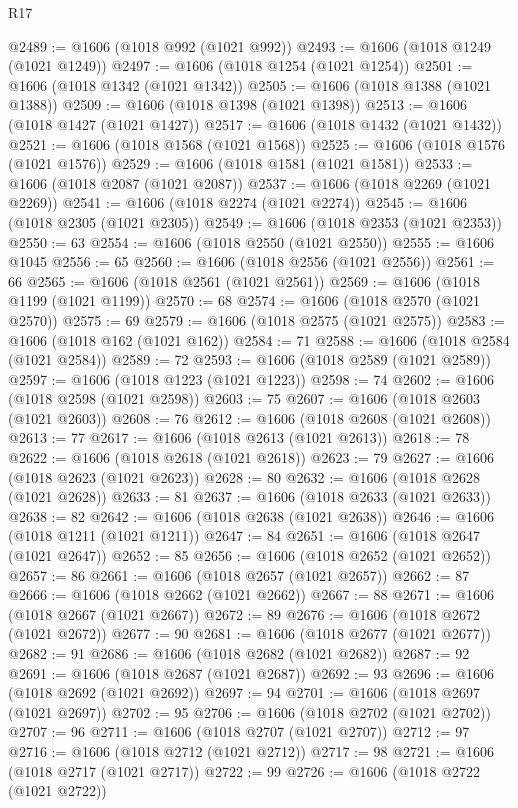 \begin{lexlean}{R17}
\begin{coremodule}
@2489 := @1606 (@1018 @992 (@1021 @992))
@2493 := @1606 (@1018 @1249 (@1021 @1249))
@2497 := @1606 (@1018 @1254 (@1021 @1254))
@2501 := @1606 (@1018 @1342 (@1021 @1342))
@2505 := @1606 (@1018 @1388 (@1021 @1388))
@2509 := @1606 (@1018 @1398 (@1021 @1398))
@2513 := @1606 (@1018 @1427 (@1021 @1427))
@2517 := @1606 (@1018 @1432 (@1021 @1432))
@2521 := @1606 (@1018 @1568 (@1021 @1568))
@2525 := @1606 (@1018 @1576 (@1021 @1576))
@2529 := @1606 (@1018 @1581 (@1021 @1581))
@2533 := @1606 (@1018 @2087 (@1021 @2087))
@2537 := @1606 (@1018 @2269 (@1021 @2269))
@2541 := @1606 (@1018 @2274 (@1021 @2274))
@2545 := @1606 (@1018 @2305 (@1021 @2305))
@2549 := @1606 (@1018 @2353 (@1021 @2353))
@2550 := 63
@2554 := @1606 (@1018 @2550 (@1021 @2550))
@2555 := @1606 @1045
@2556 := 65
@2560 := @1606 (@1018 @2556 (@1021 @2556))
@2561 := 66
@2565 := @1606 (@1018 @2561 (@1021 @2561))
@2569 := @1606 (@1018 @1199 (@1021 @1199))
@2570 := 68
@2574 := @1606 (@1018 @2570 (@1021 @2570))
@2575 := 69
@2579 := @1606 (@1018 @2575 (@1021 @2575))
@2583 := @1606 (@1018 @162 (@1021 @162))
@2584 := 71
@2588 := @1606 (@1018 @2584 (@1021 @2584))
@2589 := 72
@2593 := @1606 (@1018 @2589 (@1021 @2589))
@2597 := @1606 (@1018 @1223 (@1021 @1223))
@2598 := 74
@2602 := @1606 (@1018 @2598 (@1021 @2598))
@2603 := 75
@2607 := @1606 (@1018 @2603 (@1021 @2603))
@2608 := 76
@2612 := @1606 (@1018 @2608 (@1021 @2608))
@2613 := 77
@2617 := @1606 (@1018 @2613 (@1021 @2613))
@2618 := 78
@2622 := @1606 (@1018 @2618 (@1021 @2618))
@2623 := 79
@2627 := @1606 (@1018 @2623 (@1021 @2623))
@2628 := 80
@2632 := @1606 (@1018 @2628 (@1021 @2628))
@2633 := 81
@2637 := @1606 (@1018 @2633 (@1021 @2633))
@2638 := 82
@2642 := @1606 (@1018 @2638 (@1021 @2638))
@2646 := @1606 (@1018 @1211 (@1021 @1211))
@2647 := 84
@2651 := @1606 (@1018 @2647 (@1021 @2647))
@2652 := 85
@2656 := @1606 (@1018 @2652 (@1021 @2652))
@2657 := 86
@2661 := @1606 (@1018 @2657 (@1021 @2657))
@2662 := 87
@2666 := @1606 (@1018 @2662 (@1021 @2662))
@2667 := 88
@2671 := @1606 (@1018 @2667 (@1021 @2667))
@2672 := 89
@2676 := @1606 (@1018 @2672 (@1021 @2672))
@2677 := 90
@2681 := @1606 (@1018 @2677 (@1021 @2677))
@2682 := 91
@2686 := @1606 (@1018 @2682 (@1021 @2682))
@2687 := 92
@2691 := @1606 (@1018 @2687 (@1021 @2687))
@2692 := 93
@2696 := @1606 (@1018 @2692 (@1021 @2692))
@2697 := 94
@2701 := @1606 (@1018 @2697 (@1021 @2697))
@2702 := 95
@2706 := @1606 (@1018 @2702 (@1021 @2702))
@2707 := 96
@2711 := @1606 (@1018 @2707 (@1021 @2707))
@2712 := 97
@2716 := @1606 (@1018 @2712 (@1021 @2712))
@2717 := 98
@2721 := @1606 (@1018 @2717 (@1021 @2717))
@2722 := 99
@2726 := @1606 (@1018 @2722 (@1021 @2722))

\end{coremodule}
\end{lexlean}
